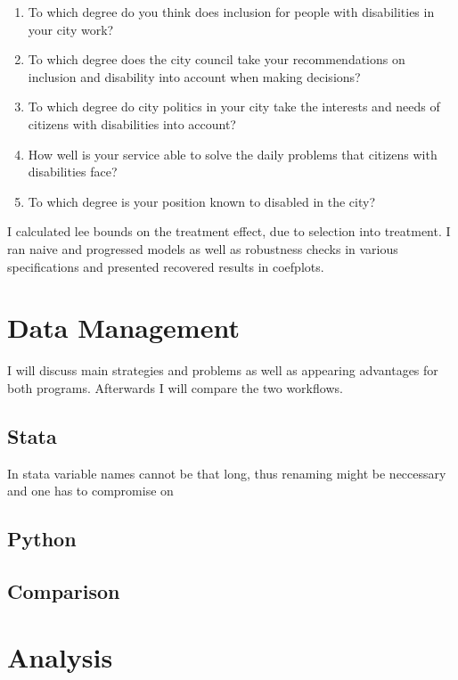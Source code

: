 \documentclass[10pt]{article}
\begin{document}
\begin{enumerate}

\item To which degree do you think does inclusion for people with disabilities in your city work? 

\item To which degree does the city council take your recommendations on inclusion and disability into account when making decisions?

\item To which degree do city politics in your city take the interests and needs of citizens with disabilities into account?

\item How well is your service able to solve the daily problems that citizens with disabilities face?

\item To which degree is your position known to disabled in the city?

\end{enumerate}

I calculated lee bounds on the treatment effect, due to selection into treatment. I ran naive and progressed
models as well as robustness checks in various specifications and presented recovered results in coefplots.

\section{Data Management}
I will discuss main strategies and problems as well as appearing advantages for both programs. Afterwards I 
will compare the two workflows.
\subsection{Stata}
In stata variable names cannot be that long, thus renaming might be neccessary and one has to compromise on 


\subsection{Python}


\subsection{Comparison}


\section{Analysis}
\end{document}
